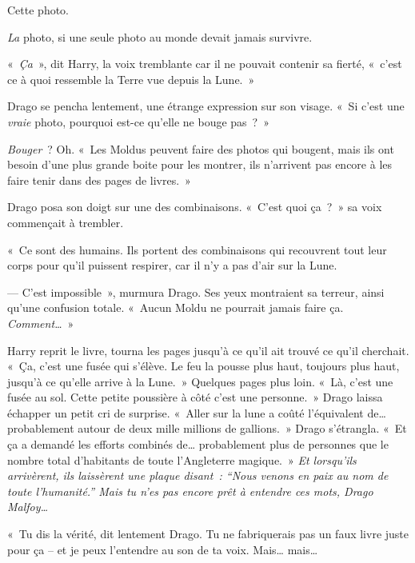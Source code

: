 Cette photo.

\emph{La} photo, si une seule photo au monde devait jamais survivre.

«~\emph{Ça}~», dit Harry, la voix tremblante car il ne pouvait contenir sa fierté, «~c'est ce à quoi ressemble la Terre vue depuis la Lune.~»

Drago se pencha lentement, une étrange expression sur son visage.
«~Si c'est une \emph{vraie} photo, pourquoi est-ce qu'elle ne bouge pas~?~»

\emph{Bouger}~? Oh. «~Les Moldus peuvent faire des photos qui bougent, mais ils ont besoin d'une plus grande boite pour les montrer, ils n'arrivent pas encore à les faire tenir dans des pages de livres.~»

Drago posa son doigt sur une des combinaisons.
«~C'est quoi ça~?~» sa voix commençait à trembler.

«~Ce sont des humains. Ils portent des combinaisons qui recouvrent tout leur corps pour qu'il puissent respirer, car il n'y a pas d'air sur la Lune.

--- C'est impossible~», murmura Drago. Ses yeux montraient sa terreur, ainsi qu'une confusion totale.
«~Aucun Moldu ne pourrait jamais faire ça. \emph{Comment…}~»

Harry reprit le livre, tourna les pages jusqu'à ce qu'il ait trouvé ce qu'il cherchait.
«~Ça, c'est une fusée qui s'élève.
Le feu la pousse plus haut, toujours plus haut, jusqu'à ce qu'elle arrive à la Lune.~»
Quelques pages plus loin. «~Là, c'est une fusée au sol. Cette petite poussière à côté c'est une personne.~»
Drago laissa échapper un petit cri de surprise.
«~Aller sur la lune a coûté l'équivalent de… probablement autour de deux mille millions de gallions.~»
Drago s'étrangla.
«~Et ça a demandé les efforts combinés de… probablement plus de personnes que le nombre total d'habitants de toute l'Angleterre magique.~»
\emph{Et lorsqu'ils arrivèrent, ils laissèrent une plaque disant~: “Nous venons en paix au nom de toute l'humanité.”
Mais tu n'es pas encore prêt à entendre ces mots, Drago Malfoy…}

«~Tu dis la vérité, dit lentement Drago. Tu ne fabriquerais pas un faux livre juste pour ça -- et je peux l'entendre au son de ta voix. Mais… mais…

